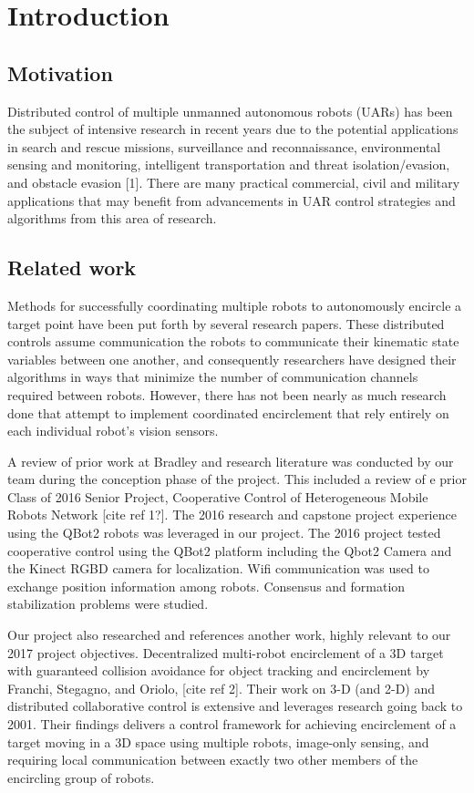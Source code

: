 \chapter{Introduction}


\section{Motivation}
Distributed control of multiple unmanned autonomous robots (UARs) has been the subject of intensive research in recent years due to the potential applications in search and rescue missions, surveillance and reconnaissance, environmental sensing and monitoring, intelligent transportation and threat isolation/evasion, and obstacle evasion [1]. There are many practical commercial, civil and military applications that may benefit from advancements in UAR control strategies and algorithms from this area of research. 

\section{Related work}
Methods for successfully coordinating multiple robots to autonomously encircle a target point have been put forth by several research papers.  These distributed controls assume communication the robots to communicate their kinematic state variables between one another, and consequently researchers have designed their algorithms in ways that minimize the number of communication channels required between robots.  However, there has not been nearly as much research done that attempt to implement coordinated encirclement that rely entirely on each individual robot’s vision sensors.

A review of prior work at Bradley and research literature was conducted by our team during the conception phase of the project.  This included a review of e prior Class of 2016 Senior Project, Cooperative Control of Heterogeneous Mobile Robots Network [cite ref 1?]. The 2016 research and capstone project experience using the QBot2 robots was leveraged in our project. The 2016 project tested cooperative control using the QBot2 platform including the Qbot2 Camera and the Kinect RGBD camera for localization.  Wiﬁ communication was used to exchange position information among robots. Consensus and formation stabilization problems were studied. 

Our project also researched and references another work, highly relevant to our 2017 project objectives. Decentralized multi-robot encirclement of a 3D target with guaranteed collision avoidance for object tracking and encirclement by Franchi, Stegagno, and Oriolo, [cite ref 2]. Their work on 3-D (and 2-D) and distributed collaborative control is extensive and leverages research going back to 2001.   Their findings delivers a control framework for achieving encirclement of a target moving in a 3D space using multiple robots, image-only sensing, and requiring local communication between exactly two other members of the encircling group of robots. 

